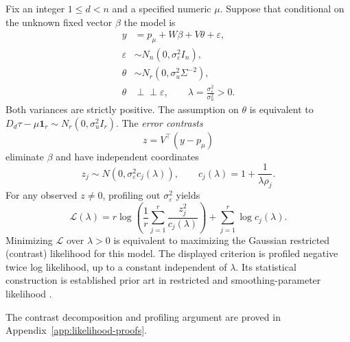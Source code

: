 \begin{theorem}
\label{thm:reml}
Fix an integer $1\le d<n$ and a specified numeric
$\mu$. Suppose that conditional on the unknown fixed
vector $\beta$ the model is
\begin{equation}\label{eq:gaussian}
\begin{aligned}
y&=p_\mu+W\beta+V\theta+\varepsilon,\\
\varepsilon&\sim N_n(0,\sigma_\varepsilon^2I_n),\\
\theta&\sim N_r(0,\sigma_u^2\Sigma^{-2}),\\
\theta&\perp\!\!\!\perp\varepsilon,\qquad
\lambda=\frac{\sigma_\varepsilon^2}{\sigma_u^2}>0.
\end{aligned}
\end{equation}
Both variances are strictly positive.
The assumption on $\theta$ is equivalent to
$D_d\tau-\mu\mathbf1_r\sim
N_r(0,\sigma_u^2I_r)$.
The \emph{error contrasts}
\begin{equation}\label{eq:contrast-z}
z=V^\top(y-p_\mu)
\end{equation}
eliminate $\beta$ and have independent coordinates
\begin{equation}\label{eq:contrast-variance}
z_j\sim N\left(0,\sigma_\varepsilon^2
c_j(\lambda)\right),\qquad
c_j(\lambda)=1+\frac{1}{\lambda\rho_j}.
\end{equation}
For any observed $z\ne0$, profiling out
$\sigma_\varepsilon^2$ yields
\begin{equation}\label{eq:ml}
\mathcal L(\lambda)=
r\log\left(\frac1r\sum_{j=1}^r
\frac{z_j^2}{c_j(\lambda)}\right)
+\sum_{j=1}^r\log c_j(\lambda).
\end{equation}
Minimizing $\mathcal L$ over $\lambda>0$
is equivalent to maximizing the Gaussian
restricted (contrast) likelihood for this model.
The displayed criterion is profiled negative
twice log likelihood, up to a constant independent
of $\lambda$. Its statistical construction is
established prior art in restricted and
smoothing-parameter likelihood
\citep{patterson1971,wahba1985,wood2011,biessy2026}.
\end{theorem}

The contrast decomposition and profiling argument are proved
in Appendix~\ref{app:likelihood-proofs}.


